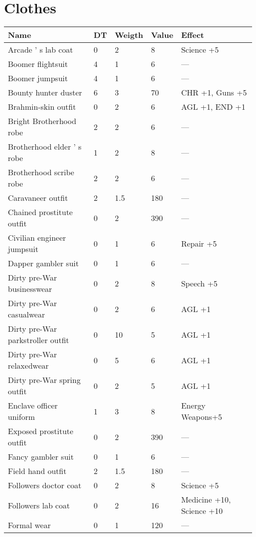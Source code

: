 \documentclass{report}
\begin{document}
\begin{table}[H]
\begin{table}[H]
\begin{table}[H]
\begin{table}[H]
\begin{table}[H]
\begin{table}[H]
\begin{table}[H]
\begin{table}[H]
\begin{table}[H]
\begin{table}[H]
\begin{table}[H]
\begin{table}[H]
\begin{table}[H]
\begin{table}[H]
\begin{table}[H]
\begin{table}[H]
\begin{table}[H]
\chapter{Clothes}
\begin{table}[H]
  \centering
  \begin{tabular}{p{30mm}p{30mm}p{30mm}p{30mm}p{30mm}}
\bfseries Name & \bfseries DT & \bfseries Weigth & \bfseries Value & \bfseries Effect \\
\hline
Arcade ' s lab coat  & 0 & 2 & 8 & Science +5  \\
Boomer flightsuit  & 4 & 1 & 6 & —  \\
Boomer jumpsuit  & 4 & 1 & 6 & —  \\
Bounty hunter duster  & 6 & 3 & 70 & CHR +1, Guns +5  \\
Brahmin-skin outfit  & 0 & 2 & 6 & AGL +1, END +1  \\
Bright Brotherhood robe  & 2 & 2 & 6 & —  \\
Brotherhood elder ' s robe  & 1 & 2 & 8 & —  \\
Brotherhood scribe robe  & 2 & 2 & 6 & —  \\
Caravaneer outfit  & 2 & 1.5  & 180 & —  \\
Chained prostitute outfit  & 0 & 2 & 390 & —  \\
Civilian engineer jumpsuit  & 0 & 1 & 6 & Repair +5  \\
Dapper gambler suit  & 0 & 1 & 6 & —  \\
Dirty pre-War businesswear  & 0 & 2 & 8 & Speech +5  \\
Dirty pre-War casualwear  & 0 & 2 & 6 & AGL +1  \\
Dirty pre-War parkstroller outfit  & 0 & 10 & 5 & AGL +1  \\
Dirty pre-War relaxedwear  & 0 & 5 & 6 & AGL +1  \\
Dirty pre-War spring outfit  & 0 & 2 & 5 & AGL +1  \\
Enclave officer uniform  & 1 & 3 & 8 & Energy Weapons+5  \\
Exposed prostitute outfit  & 0 & 2 & 390 & —  \\
Fancy gambler suit  & 0 & 1 & 6 & —  \\
Field hand outfit  & 2 & 1.5  & 180 & —  \\
Followers doctor coat  & 0 & 2 & 8 & Science +5  \\
Followers lab coat  & 0 & 2 & 16 & Medicine +10, Science +10  \\
Formal wear  & 0 & 1 & 120 & —  \\

\end{tabular}
\end{table}
\end{table}
\end{table}
\end{table}
\end{table}
\end{table}
\end{table}
\end{table}
\end{table}
\end{table}
\end{table}
\end{table}
\end{table}
\end{table}
\end{table}
\end{table}
\end{table}
\end{table}
\end{document}
